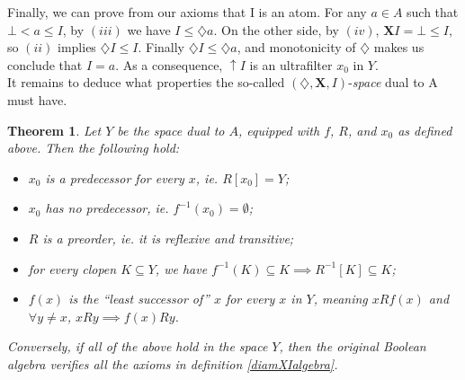 \documentclass[11pt]{article}
\newtheorem{theorem}{Theorem}
\begin{document}
Finally, we can prove from our axioms that I is an atom.
For any $a \in A$ such that $\bot < a\leq I$, by $(iii)$ we have $I\leq \diamondsuit a$.
On the other side, by $(iv)$, $\mathbf{X}I =\bot \leq I$, so $(ii)$ implies $\diamondsuit I \leq I$.
Finally $\diamondsuit I \leq \diamondsuit a$, and monotonicity of $\diamondsuit$ makes us conclude that $I=a$.
As a consequence, $\uparrow I$ is an ultrafilter $x_0$ in $Y$.\\
It remains to deduce what properties the so-called $(\diamondsuit,\mathbf{X},I)$-\emph{space} dual to A must have.

\begin{theorem}\label{duality}
    Let $Y$ be the space dual to $A$, equipped with $f$, $R$, and $x_0$ as defined above. Then the following hold:
    \begin{itemize}
        \item $x_0$ is a predecessor for every $x$, \emph{ie.} $R[x_0] = Y$;
        \item $x_0$ has no predecessor, \emph{ie.} $f^{-1}(x_0) =  \emptyset$;
        \item $R$ is a preorder, \emph{ie.} it is reflexive and transitive;
        \item for every clopen $K \subseteq Y$, we have $f^{-1}(K)\subseteq K \implies R^{-1}[K]\subseteq K$;
        \item $f(x)$ is the ``least successor of'' $x$ for every $x$ in $Y$, meaning $x R f(x)$ and $\forall y \neq x$, $x R y \implies f(x) R y$.
    \end{itemize}
    Conversely, if all of the above hold in the space $Y$, then the original Boolean algebra verifies all the axioms in definition \ref{diamXIalgebra}.
\end{theorem}
\end{document}

